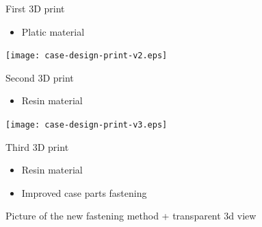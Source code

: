 \documentclass[compress,red]{beamer}
\begin{document}
\begin{frame}{First 3D print}

  \begin{itemize}
  \item Platic material
  \end{itemize}

  \begin{center}
    \texttt{[image: case-design-print-v2.eps]}
  \end{center}


\end{frame}

\begin{frame}{Second 3D print}

  \begin{itemize}
  \item Resin material
  \end{itemize}

  \begin{center}
    \texttt{[image: case-design-print-v3.eps]}
  \end{center}


\end{frame}


\begin{frame}{Third 3D print}

  \begin{itemize}
  \item Resin material
  \item Improved case parts fastening
  \end{itemize}

  \begin{center}
    Picture of the new fastening method + transparent 3d view
  \end{center}

  \note{}

\end{frame}



\end{document}
